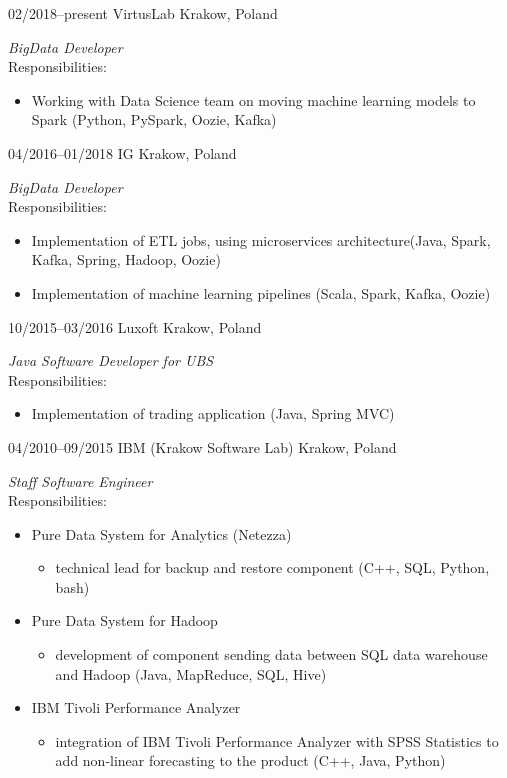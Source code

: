 \documentclass[]{gaza-cv} %
\begin{document}
\begin{entrylist}

\entry
{02/2018--present}
{VirtusLab}
{Krakow, Poland}
{\emph{ BigData Developer}\\
Responsibilities:
\begin{itemize}
    \item Working with Data Science team on moving machine learning models to Spark (Python, PySpark, Oozie, Kafka)
\end{itemize}}


\entry
{04/2016--01/2018}
{IG}
{Krakow, Poland}
{\emph{ BigData Developer}\\
Responsibilities:
\begin{itemize}
\item Implementation of ETL jobs, using microservices architecture(Java, Spark, Kafka, Spring, Hadoop, Oozie)
\item Implementation of machine learning pipelines (Scala, Spark, Kafka, Oozie)
\end{itemize}}


\entry
{10/2015--03/2016}
{Luxoft}
{Krakow, Poland}
{\emph{Java Software Developer for UBS} \\
Responsibilities:
\begin{itemize}
\item Implementation of trading application (Java, Spring MVC)
\end{itemize}}


\entry
{04/2010--09/2015}
{IBM (Krakow Software Lab)}
{Krakow, Poland}
{\emph{Staff Software Engineer}\\
Responsibilities:
\begin{itemize}
\item Pure Data System for Analytics (Netezza)
\begin{itemize}
\item technical lead for backup and restore component (C++, SQL, Python, bash)
\end{itemize}
\item Pure Data System for Hadoop
\begin{itemize}
\item development of component sending data between SQL data warehouse and Hadoop (Java, MapReduce, SQL, Hive)
\end{itemize}
\item IBM Tivoli Performance Analyzer
\begin{itemize}
\item integration of IBM Tivoli Performance Analyzer with SPSS Statistics to add non-linear forecasting to the product (C++, Java, Python)
\end{itemize}
\end{itemize}}

\end{entrylist}
\end{document}
